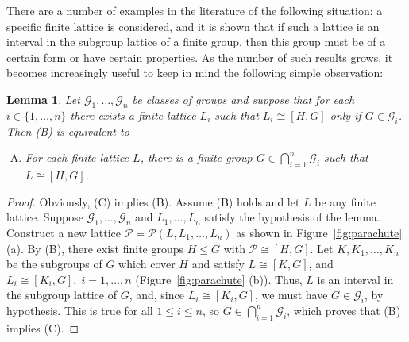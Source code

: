 \documentclass[cm,dissertation]{uhthesis}
\theoremstyle{plain}
\newtheorem{lemma}[theorem]{Lemma}
\theoremstyle{definition}
\theoremstyle{remark}
\numberwithin{theorem}{section}
\numberwithin{claim}{chapter}
\numberwithin{equation}{section}
\numberwithin{conjecture}{chapter}
\newcommand{\<}{\ensuremath{\langle}}
\renewcommand{\>}{\ensuremath{\rangle}}
\renewcommand{\leq}{\ensuremath{\leqslant}}
\newcommand{\0}{\ensuremath{\mathbf{0}}}
\newcommand{\1}{\ensuremath{\mathbf{1}}}
\newcommand{\2}{\ensuremath{\mathbf{2}}}
\newcommand{\3}{\ensuremath{\mathbf{3}}}
\newcommand{\4}{\ensuremath{\mathbf{4}}}
\newcommand{\5}{\ensuremath{\mathbf{5}}}
\newcommand{\sG}{\ensuremath{\mathscr{G}}}
\newcommand{\sP}{\ensuremath{\mathscr{P}}}
\begin{document}
There are a number of examples in the literature of the following situation: a specific
finite lattice is considered, and it is shown that if
such a lattice is an interval in the subgroup lattice of a finite group, then this
group must be of a certain form or have certain properties.
As the number of such results grows, it becomes increasingly useful to keep in
mind the following simple observation: 
\begin{lemma}
\label{lemma-wjd-1}
Let $\sG_1, \dots, \sG_n$ be classes of groups and  
suppose that for each $i\in \{1, \dots, n\}$ there exists a finite lattice $L_i$
such that
$L_i \cong [H, G]$ only if $G\in \sG_i$.
Then (B) is equivalent to
\begin{enumerate}[(C)]
\item For each finite lattice $L$, there is a finite group $G \in
  \bigcap\limits_{i=1}^n \sG_i$ such that $L \cong [H,G]$.
\end{enumerate}
\end{lemma}
\begin{proof}
Obviously, (C) implies (B).  Assume (B) holds and let $L$ be any finite lattice.  Suppose 
$\sG_1, \dots, \sG_n$ and $L_1, \dots, L_n$ satisfy the hypothesis of the lemma.
Construct a new lattice $\sP = \sP(L, L_1, \dots, L_n)$ as shown in
Figure~\ref{fig:parachute} (a).
By (B), there exist finite groups $H \leq G$ with $\sP \cong [H,G]$.  
Let $K, K_1, \dots, K_n$ be the subgroups of $G$ 
which cover $H$ and satisfy $L \cong [K, G]$, and 
$L_i \cong [K_i, G],\; i=1, \dots, n$ (Figure~\ref{fig:parachute} (b)).
Thus, $L$ is an interval in the subgroup lattice of $G$, and,
since $L_i \cong [K_i, G]$, we must have $G\in \sG_i$, by hypothesis.  This is true
for all $1\leq i \leq n$, so $G \in \bigcap\limits_{i=1}^n \sG_i$, which proves that
(B) implies (C).
\end{proof}
\end{document}
